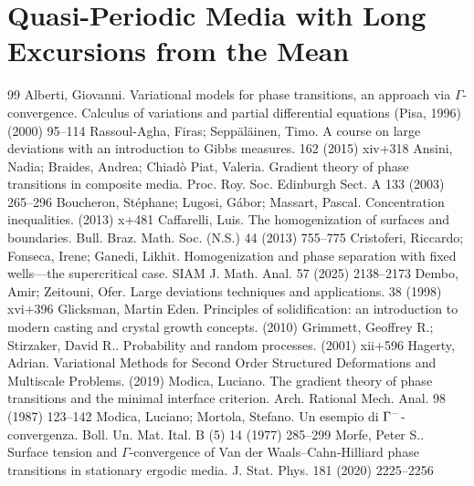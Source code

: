 \documentclass[10pt,a4paper]{amsart}
\begin{document}

\section{Quasi-Periodic Media with Long Excursions from the Mean} \label{S: quasiperiodic examples}


\begin{thebibliography}{99}
 Alberti, Giovanni. Variational models for phase transitions, an approach via {$\Gamma$}-convergence. Calculus of variations and partial differential equations ({P}isa, 1996) (2000) 95--114
 Rassoul-Agha, Firas; Sepp\"al\"ainen, Timo. A course on large deviations with an introduction to {G}ibbs measures. 162 (2015) xiv+318
 Ansini, Nadia; Braides, Andrea; Chiad\`o Piat, Valeria. Gradient theory of phase transitions in composite media. Proc. Roy. Soc. Edinburgh Sect. A 133 (2003) 265--296
 Boucheron, St\'ephane; Lugosi, G\'abor; Massart, Pascal. Concentration inequalities. (2013) x+481
 Caffarelli, Luis. The homogenization of surfaces and boundaries. Bull. Braz. Math. Soc. (N.S.) 44 (2013) 755--775
 Cristoferi, Riccardo; Fonseca, Irene; Ganedi, Likhit. Homogenization and phase separation with fixed wells---the supercritical case. SIAM J. Math. Anal. 57 (2025) 2138--2173
 Dembo, Amir; Zeitouni, Ofer. Large deviations techniques and applications. 38 (1998) xvi+396
 Glicksman, Martin Eden. Principles of solidification: an introduction to modern casting and crystal growth concepts. (2010)
 Grimmett, Geoffrey R.; Stirzaker, David R.. Probability and random processes. (2001) xii+596
 Hagerty, Adrian. Variational Methods for Second Order Structured Deformations and Multiscale Problems. (2019)
 Modica, Luciano. The gradient theory of phase transitions and the minimal interface criterion. Arch. Rational Mech. Anal. 98 (1987) 123--142
 Modica, Luciano; Mortola, Stefano. Un esempio di {$\Gamma \sp{-}$}-convergenza. Boll. Un. Mat. Ital. B (5) 14 (1977) 285--299
 Morfe, Peter S.. Surface tension and {$\Gamma$}-convergence of {V}an der {W}aals--{C}ahn-{H}illiard phase transitions in stationary ergodic media. J. Stat. Phys. 181 (2020) 2225--2256

\end{thebibliography}
\end{document}
